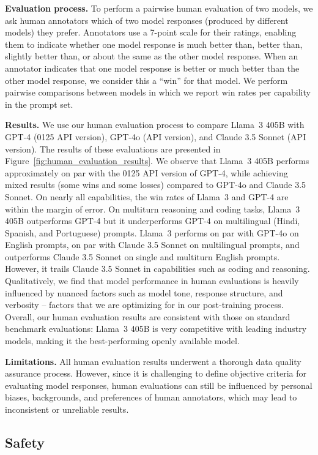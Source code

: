 \textbf{Evaluation process.} To perform a pairwise human evaluation of two models, we ask human annotators which of two model responses (produced by different models) they prefer. Annotators use a 7-point scale for their ratings, enabling them to indicate whether one model response is much better than, better than, slightly better than, or about the same as the other model response. When an annotator indicates that one model response is better or much better than the other model response, we consider this a ``win'' for that model. We perform pairwise comparisons between models in which we report win rates per capability in the prompt set.

\textbf{Results.}
We use our human evaluation process to compare Llama~3 405B with GPT-4 (0125 API version), GPT-4o (API version), and Claude 3.5 Sonnet (API version). The results of these evaluations are presented in Figure~\ref{fig:human_evaluation_results}.
We observe that Llama~3 405B performs approximately on par with the 0125 API version of GPT-4, while achieving mixed results (some wins and some losses) compared to GPT-4o and Claude 3.5 Sonnet. On nearly all capabilities, the win rates of Llama~3 and GPT-4 are within the margin of error. On multiturn reasoning and coding tasks, Llama~3 405B outperforms GPT-4 but it underperforms GPT-4 on multilingual (Hindi, Spanish, and Portuguese) prompts. Llama~3 performs on par with GPT-4o on English prompts, on par with Claude 3.5 Sonnet on multilingual prompts, and outperforms Claude 3.5 Sonnet on single and multiturn English prompts. However, it trails Claude 3.5 Sonnet in capabilities such as coding and reasoning. Qualitatively, we find that model performance in human evaluations is heavily influenced by nuanced factors such as model tone, response structure, and verbosity -- factors that we are optimizing for in our post-training process. Overall, our human evaluation results are consistent with those on standard benchmark evaluations: Llama~3 405B is very competitive with leading industry models, making it the best-performing openly available model.

\textbf{Limitations.} All human evaluation results underwent a thorough data quality assurance process. However, since it is challenging to define objective criteria for evaluating model responses, human evaluations can still be influenced by personal biases, backgrounds, and preferences of human annotators, which may lead to inconsistent or unreliable results.

\subsection{Safety}
\label{section:results_safety}

